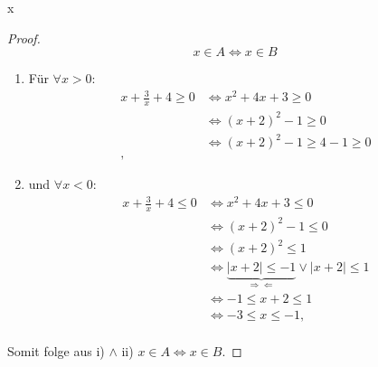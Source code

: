 \documentclass{problemset}
\begin{document}
\begin{problem}{x}
\begin{proof}
    \begin{displaymath}
        x \in A  \Leftrightarrow x \in B
    \end{displaymath}
    \begin{enumerate}[label=\roman*)]
        \item 	Für $\forall x > 0$:
              \begin{align*}
                  x + \frac{3}{x} + 4 \ge 0 & \Leftrightarrow x^2 +  4x + 3 \ge 0             \\
                                            & \Leftrightarrow {(x + 2)}^2  - 1 \ge 0          \\
                                            & \Leftrightarrow {(x + 2)}^2  - 1 \ge 4 -1 \ge 0 \\,
              \end{align*}

        \item 	und $\forall x < 0$:
              \begin{align*}
                  x + \frac{3}{x} + 4 \le 0 & \Leftrightarrow x^2 +  4x + 3 \le 0                                                                   \\
                                            & \Leftrightarrow {(x + 2)}^2  - 1 \le 0                                                                \\
                                            & \Leftrightarrow {(x + 2)}^2  \le 1                                                                    \\
                                            & \Leftrightarrow \underbrace{ \mid x+2 \mid \le -1}_{\Rightarrow\Leftarrow} \lor \mid x + 2 \mid \le 1 \\
                                            & \Leftrightarrow -1 \le x + 2 \le 1                                                                    \\
                                            & \Leftrightarrow -3 \le x  \le -1,                                                                     \\
              \end{align*}

    \end{enumerate}
    Somit folge aus i) $\land$ ii) $x \in A \Leftrightarrow x \in B$.
\end{proof}
\end{problem}
\end{document}
